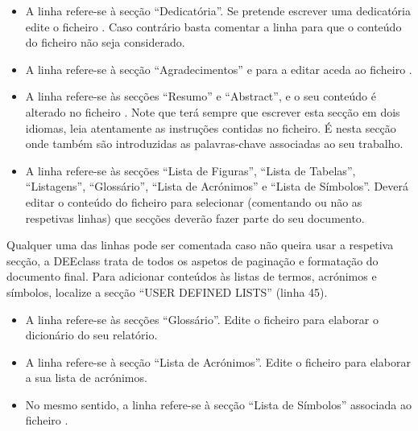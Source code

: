 \begin{itemize}
\item A linha \verb|| refere-se à secção ``Dedicatória''. Se pretende escrever uma dedicatória edite o ficheiro . Caso contrário basta comentar a linha para que o conteúdo do ficheiro não seja considerado.
\item A linha \verb|| refere-se à secção ``Agradecimentos'' e para a editar aceda ao ficheiro .
\item A linha \verb|| refere-se às secções ``Resumo'' e ``Abstract'', e o seu conteúdo é alterado no ficheiro . Note que terá sempre que escrever esta secção em dois idiomas, leia atentamente as instruções contidas no ficheiro. É nesta secção onde também são introduzidas as palavras-chave associadas ao seu trabalho.
\item A linha \verb|| refere-se às secções ``Lista de Figuras'', ``Lista de Tabelas'', ``Listagens'', ``Glossário'', ``Lista de Acrónimos'' e ``Lista de Símbolos''. Deverá editar o conteúdo do ficheiro  para selecionar (comentando ou não as respetivas linhas) que secções deverão fazer parte do seu documento.
\end{itemize}

Qualquer uma das linhas pode ser comentada caso não queira usar a respetiva secção, a DEEclass trata de todos os aspetos de paginação e formatação do documento final. Para adicionar conteúdos às listas de termos, acrónimos e símbolos, localize a secção ``USER DEFINED LISTS'' (linha 45).

\begin{itemize}
\item A linha \verb|| refere-se às secções ``Glossário''. Edite o ficheiro  para elaborar o dicionário do seu relatório.
\item A linha \verb|| refere-se à secção ``Lista de Acrónimos''. Edite o ficheiro  para elaborar a sua lista de acrónimos.
\item No mesmo sentido, a linha \verb|| refere-se à secção ``Lista de Símbolos'' associada ao ficheiro .
\end{itemize}


